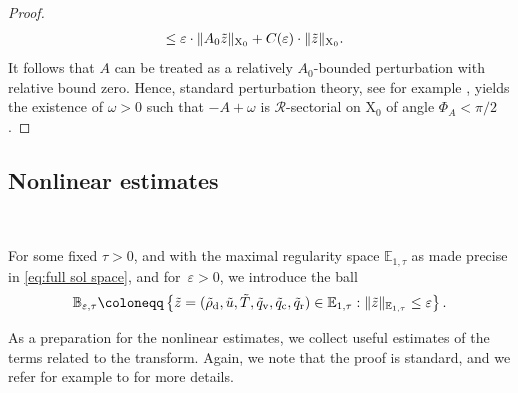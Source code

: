 \documentclass[10pt]{amsart}
\theoremstyle{plain}
\theoremstyle{definition}
\theoremstyle{thm}
\numberwithin{equation}{section}
\newcommand{\rX}{\mathrm{X}}
\newcommand{\cR}{\mathcal{R}}
\newcommand{\E}{\mathbb{E}}
\newcommand{\eps}{\varepsilon}
\newcommand{\rd}{\mathrm{d}}
\newcommand{\rr}{\mathrm{r}}
\newcommand{\rv}{\mathrm{v}}
\newcommand{\rc}{\mathrm{c}}
\newcommand{\trho}{\Tilde{\rho}}
\newcommand{\tu}{\Tilde{u}}
\newcommand{\tz}{\Tilde{z}}
\newcommand{\tT}{\Tilde{T}}
\newcommand{\tq}{\Tilde{q}}
\begin{document}
\begin{proof}
\begin{equation*}
\begin{aligned}
            &\leq \eps \cdot \| A_0 \tz \|_{\rX_0} + C(\eps) \cdot \| \tz \|_{\rX_0}.
        \end{aligned}
    \end{equation*}
    It follows that $A$ can be treated as a relatively $A_0$-bounded perturbation with relative bound zero.
    Hence, standard perturbation theory, see for example \cite[Prop.~4.3]{DHP:03}, yields the existence of $\omega>0$ such that $-A+\omega$ is $\cR$-sectorial on $\rX_0$ of angle $\Phi_A < \pi/2$.
\end{proof}

\subsection{Nonlinear estimates}
\

For some fixed $\tau > 0$, and with the maximal regularity space $\E_{1,\tau}$ as made precise in \eqref{eq:full sol space}, and for~$\eps > 0$, we introduce the ball
\begin{equation}\label{eq:sol ball} 
    \mathbb{B}_{\eps, \tau}\coloneqq\left\{\tz = (\trho_{\rd},\tu, \tT,\tq_\rv,\tq_\rc,\tq_\rr) \in \E_{1,\tau} : \| \tz \|_{\E_{1,\tau}}\leq \eps\right\}.
\end{equation}

As a preparation for the nonlinear estimates, we collect useful estimates of the terms related to the transform.
Again, we note that the proof is standard, and we refer for example to \cite[Sec.~3.9]{HMTT:19} for more details.
\end{document}
